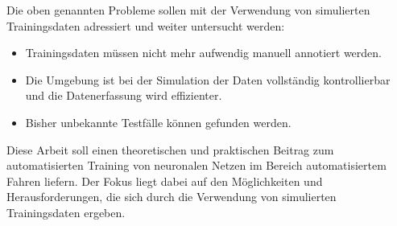 Die oben genannten Probleme sollen mit der Verwendung von simulierten Trainingsdaten adressiert und weiter untersucht werden:

\begin{itemize}
\item Trainingsdaten müssen nicht mehr aufwendig manuell annotiert werden.
\item Die Umgebung ist bei der Simulation der Daten vollständig kontrollierbar und die Datenerfassung wird effizienter.
\item Bisher unbekannte Testfälle können gefunden werden.
\end{itemize}

Diese Arbeit soll einen theoretischen und praktischen Beitrag zum automatisierten Training von neuronalen Netzen im Bereich automatisiertem Fahren liefern. Der Fokus liegt dabei auf den Möglichkeiten und Herausforderungen, die sich durch die Verwendung von simulierten Trainingsdaten ergeben.

